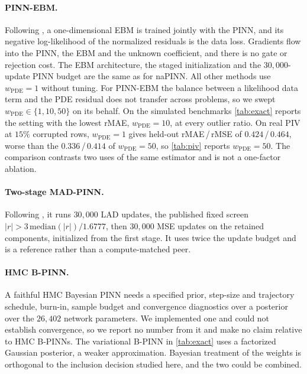 \documentclass[twoside]{article}
\newcommand{\wpde}{w_{\mathrm{PDE}}}
\begin{document}
\paragraph{PINN-EBM.}
\label{app:pinnebm}
Following \citet{Pilar2024}, a one-dimensional EBM is trained jointly with the
PINN, and its negative log-likelihood of the normalized residuals is the data
loss. Gradients flow into the PINN, the EBM and the unknown coefficient, and
there is no gate or rejection cost. The EBM architecture, the staged
initialization and the $30{,}000$-update PINN budget are the same as for
naPINN. All other methods use $\wpde = 1$ without tuning. For PINN-EBM the
balance between a likelihood data term and the PDE residual does not transfer
across problems, so we swept $\wpde \in \{1, 10, 50\}$ on its behalf. On the
simulated benchmarks \cref{tab:exact} reports the setting with the lowest
rMAE, $\wpde = 10$, at every outlier ratio. On real PIV at $15\%$ corrupted rows, $\wpde = 1$ gives
held-out rMAE\,/\,rMSE of $0.424$\,/\,$0.464$, worse than the
$0.336$\,/\,$0.414$ of $\wpde = 50$, so \cref{tab:piv} reports $\wpde = 50$. The
comparison contrasts two uses of the same estimator and is not a one-factor
ablation.

\paragraph{Two-stage MAD-PINN.}
Following \citet{Peng2022}, it runs $30{,}000$ LAD updates, the published fixed screen
$|r| > 3\,\mathrm{median}(|r|)/1.6777$, then $30{,}000$ MSE updates on the
retained components, initialized from the first stage. It uses twice the update
budget and is a reference rather than a compute-matched peer.

\paragraph{HMC B-PINN.}
\label{app:notrun}
A faithful HMC Bayesian PINN \citep{Yang2021} needs a specified prior, step-size
and trajectory schedule, burn-in, sample budget and convergence diagnostics over
a posterior over the $26{,}402$ network parameters. We implemented one and could not
establish convergence, so we report no number from it and make no claim relative
to HMC B-PINNs. The variational B-PINN in \cref{tab:exact} uses a factorized
Gaussian posterior, a weaker approximation. Bayesian treatment of the weights is
orthogonal to the inclusion decision studied here, and the two could be
combined.
\end{document}

